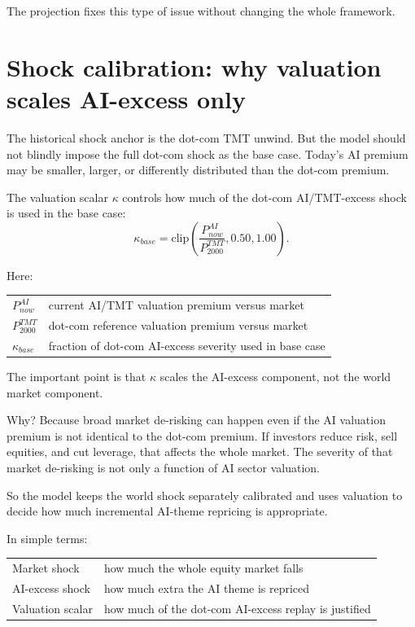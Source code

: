 \documentclass[10pt]{article}
\begin{document}
The projection fixes this type of issue without changing the whole framework.

\section{Shock calibration: why valuation scales AI-excess only}

The historical shock anchor is the dot-com TMT unwind. But the model should not blindly impose the full dot-com shock as the base case. Today's AI premium may be smaller, larger, or differently distributed than the dot-com premium.

The valuation scalar $\kappa$ controls how much of the dot-com AI/TMT-excess shock is used in the base case:
\[
\kappa_{base}=\mbox{clip}\left(\frac{P_{now}^{AI}}{P_{2000}^{TMT}},0.50,1.00\right).
\]

Here:

\begin{center}
\begin{tabular}{ll}
$P_{now}^{AI}$ & current AI/TMT valuation premium versus market \\
$P_{2000}^{TMT}$ & dot-com reference valuation premium versus market \\
$\kappa_{base}$ & fraction of dot-com AI-excess severity used in base case
\end{tabular}
\end{center}

The important point is that $\kappa$ scales the AI-excess component, not the world market component.

Why? Because broad market de-risking can happen even if the AI valuation premium is not identical to the dot-com premium. If investors reduce risk, sell equities, and cut leverage, that affects the whole market. The severity of that market de-risking is not only a function of AI sector valuation.

So the model keeps the world shock separately calibrated and uses valuation to decide how much incremental AI-theme repricing is appropriate.

In simple terms:

\begin{center}
\begin{tabular}{ll}
Market shock & how much the whole equity market falls \\
AI-excess shock & how much extra the AI theme is repriced \\
Valuation scalar & how much of the dot-com AI-excess replay is justified
\end{tabular}
\end{center}
\end{document}
